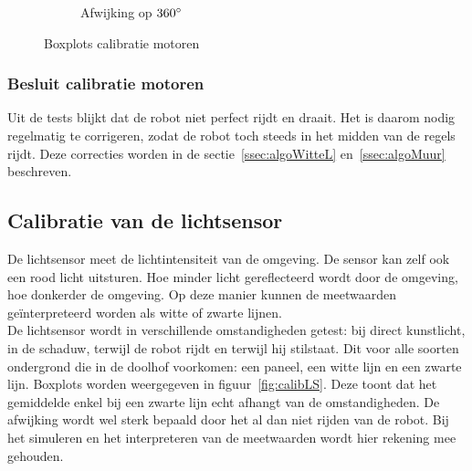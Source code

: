 \documentclass[tt3]{penoverslag}
\begin{document}
\begin{figure}
\begin{subfigure}[h]{0.32\textwidth}
                \caption{Afwijking op $360 \degree$}
        \end{subfigure}
 \caption{Boxplots calibratie motoren}
\label{fig:calibM}
\end{figure}

\subsubsection{Besluit calibratie motoren} %
\label{ssec:calibMbesluit}
Uit de tests blijkt dat de robot niet perfect rijdt en draait. Het is daarom nodig regelmatig te corrigeren, zodat de robot toch steeds in het midden van de regels rijdt. Deze correcties worden in de sectie~\ref{ssec:algoWitteL} en~\ref{ssec:algoMuur} beschreven.


\subsection{Calibratie van de lichtsensor} %
\label{ssec:calibLS}
De lichtsensor meet de lichtintensiteit van de omgeving. De sensor kan zelf ook een rood licht uitsturen. Hoe minder licht gereflecteerd wordt door de omgeving, hoe donkerder de omgeving. Op deze manier kunnen de meetwaarden ge\"interpreteerd worden als witte of zwarte lijnen.\\
De lichtsensor wordt in verschillende omstandigheden getest: bij direct kunstlicht, in de schaduw, terwijl de robot rijdt en terwijl hij stilstaat. Dit voor alle soorten ondergrond die in de doolhof voorkomen: een paneel, een witte lijn en een zwarte lijn. Boxplots worden weergegeven in figuur~\ref{fig:calibLS}. Deze toont dat het gemiddelde enkel bij een zwarte lijn echt afhangt van de omstandigheden. De afwijking wordt wel sterk bepaald door het al dan niet rijden van de robot. Bij het simuleren en het interpreteren van de meetwaarden wordt hier rekening mee gehouden.
\end{document}
